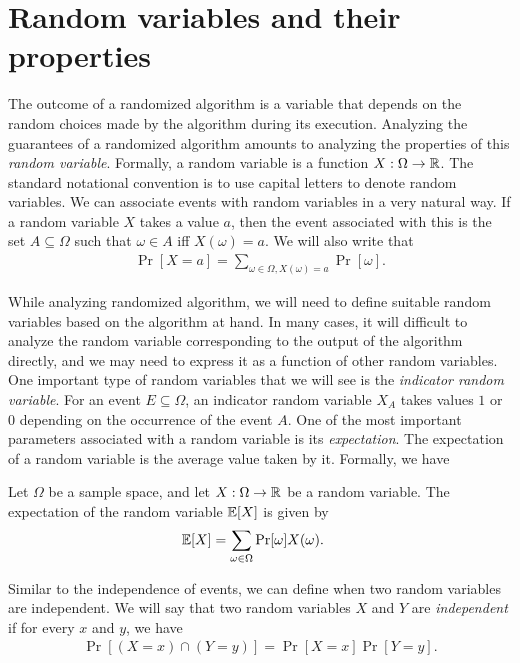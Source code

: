 \chapter{Random variables and their properties}

The outcome of a randomized algorithm is a variable that depends on the random choices made by the algorithm during its execution. Analyzing the guarantees of a randomized algorithm amounts to analyzing the properties of this \emph{random variable}. Formally, a random variable is a function $X:\Omega \to \mathbb{R}$. The standard notational convention is to use capital letters to denote random variables. We can associate events with random variables in a very natural way. If a random variable $X$ takes a value $a$, then the event associated with this is the set $A \subseteq \Omega$ such that $\omega \in A$ iff $X(\omega) = a$. We will also write that 
\begin{align*}
	\Pr[X=a] = \sum_{\omega \in \Omega, X(\omega)=a} \Pr[\omega]. 
\end{align*}

While analyzing randomized algorithm, we will need to define suitable random variables based on the algorithm  at hand. In many cases, it will difficult to analyze the random variable corresponding to the output of the algorithm directly, and we may need to express it as a function of other random variables. One important type of random variables that we will see is the \emph{indicator random variable}. For an event $E\subseteq \Omega$, an indicator random variable $X_A$ takes values $1$ or $0$ depending on the occurrence of the event $A$. One of the most important parameters associated with a random variable is its \emph{expectation}. The expectation of a random variable is the average value taken by it. Formally, we have
\begin{definition}
	[Expectation]
	Let $\Omega$ be a sample space, and let $X:\Omega \to \mathbb{R}$ be a random variable. The expectation of the random variable $\mathbb{E}[X]$ is given by
	\begin{align*}
		\mathbb{E}[X] &= \sum_{\omega \in \Omega} \Pr[\omega] X(\omega).
	\end{align*}
	\label{defn:exp}
\end{definition}

Similar to the independence of events, we can define when two random variables are independent. We will say that two random variables $X$ and $Y$ are \emph{independent} if for every $x$ and $y$, we have
\begin{align*}
	\Pr[(X=x) \cap (Y=y)] = \Pr[X=x]\Pr[Y=y].
\end{align*}

